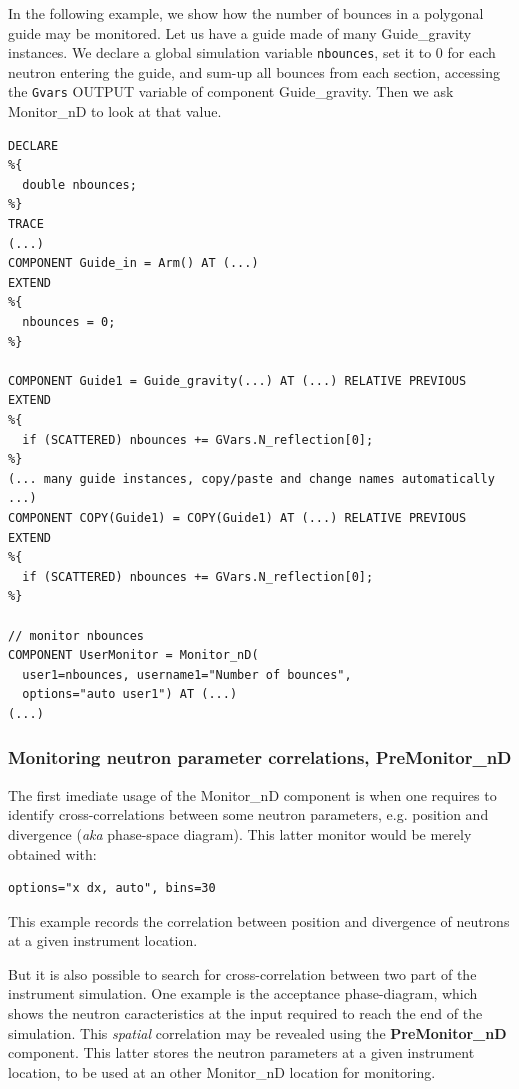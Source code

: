 In the following example, we show how the number of bounces in a polygonal guide may be monitored. Let us have a guide made of many Guide\_gravity instances. We declare a global simulation variable \verb+nbounces+, set it to 0 for each neutron entering the guide, and sum-up all bounces from each section, accessing the \verb+Gvars+ OUTPUT variable of component Guide\_gravity. Then we ask Monitor\_nD to look at that value.
\begin{lstlisting}
DECLARE
%{
  double nbounces;
%}
TRACE
(...)
COMPONENT Guide_in = Arm() AT (...)
EXTEND
%{
  nbounces = 0;
%}

COMPONENT Guide1 = Guide_gravity(...) AT (...) RELATIVE PREVIOUS
EXTEND
%{
  if (SCATTERED) nbounces += GVars.N_reflection[0];
%}
(... many guide instances, copy/paste and change names automatically ...)
COMPONENT COPY(Guide1) = COPY(Guide1) AT (...) RELATIVE PREVIOUS
EXTEND
%{
  if (SCATTERED) nbounces += GVars.N_reflection[0];
%}

// monitor nbounces
COMPONENT UserMonitor = Monitor_nD(
  user1=nbounces, username1="Number of bounces",
  options="auto user1") AT (...)
(...)
\end{lstlisting}

\subsubsection{Monitoring neutron parameter correlations, PreMonitor\_nD}

The first imediate usage of the Monitor\_nD component is when one requires to identify cross-correlations between some neutron parameters, e.g. position and divergence (\textit{aka} phase-space diagram). This latter monitor would be merely obtained with:
\begin{lstlisting}
options="x dx, auto", bins=30
\end{lstlisting}
This example records the correlation between position and divergence of neutrons at a given instrument location.


But it is also possible to search for cross-correlation between two part of the instrument simulation. One example is the acceptance phase-diagram, which shows the neutron caracteristics at the input required to reach the end of the simulation. This \emph{spatial} correlation may be revealed using the \textbf{PreMonitor\_nD} component. This latter stores the neutron parameters at a given instrument location, to be used at an other Monitor\_nD location for monitoring.

